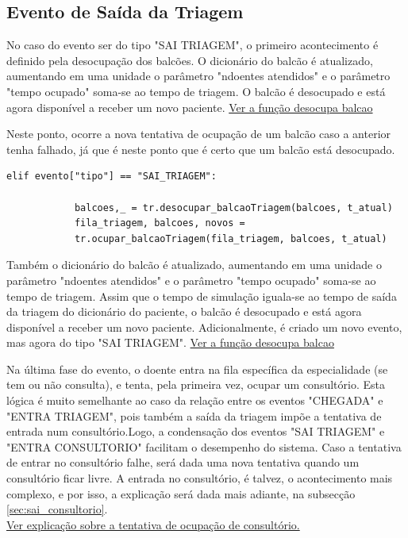 \documentclass[12pt,a4paper]{article} %
\begin{document}
    \subsection{Evento de Saída da Triagem}

    No caso do evento ser do tipo "SAI TRIAGEM", o primeiro acontecimento é definido pela desocupação dos balcões. O dicionário do balcão é atualizado, aumentando em uma unidade o parâmetro "ndoentes atendidos" e o parâmetro "tempo ocupado" soma-se ao tempo de triagem. O balcão é desocupado e está agora disponível a receber um novo paciente. \hyperlink{desocupa_balcao}{Ver a função desocupa balcao}

    \medskip
    \hypertarget{tenta_ocupar_balcao}{}
    Neste ponto, ocorre a nova tentativa de ocupação de um balcão caso a anterior tenha falhado, já que é neste ponto que é certo que um balcão está desocupado.

\begin{verbatim}
elif evento["tipo"] == "SAI_TRIAGEM":

            balcoes,_ = tr.desocupar_balcaoTriagem(balcoes, t_atual)
            fila_triagem, balcoes, novos = 
            tr.ocupar_balcaoTriagem(fila_triagem, balcoes, t_atual)
\end{verbatim}

    \medskip 
    Também o dicionário do balcão é atualizado, aumentando em uma unidade o parâmetro "ndoentes atendidos" e o parâmetro "tempo ocupado" soma-se ao tempo de triagem. Assim que o tempo de simulação iguala-se  ao tempo de saída da triagem do dicionário do paciente, o balcão é desocupado e está agora disponível a receber um novo paciente. Adicionalmente, é criado um novo evento, mas agora do tipo "SAI TRIAGEM". \hyperlink{desocupa_balcao}{Ver a função desocupa balcao}

    \medskip
    Na última fase do evento, o doente entra na fila específica da especialidade (se tem ou não consulta), e tenta, pela primeira vez, ocupar um consultório. Esta lógica é muito semelhante ao caso da relação entre os eventos "CHEGADA" e "ENTRA TRIAGEM", pois também a saída da triagem impõe a tentativa de entrada num consultório.Logo, a condensação dos eventos "SAI TRIAGEM" e "ENTRA CONSULTORIO" facilitam o desempenho do sistema. Caso a tentativa de entrar no consultório falhe, será dada uma nova tentativa quando um consultório ficar livre. A entrada no consultório, é talvez, o acontecimento mais complexo, e por isso, a explicação será dada mais adiante, na subsecção \ref{sec:sai_consultorio}.\\ 
    \hyperlink{tenta_ocupar_consultorio}{Ver explicação sobre a tentativa de ocupação de consultório.}
\end{document}
